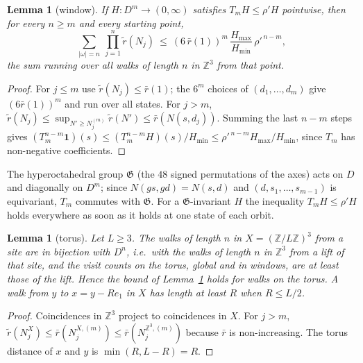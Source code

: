 \documentclass[11pt,a4paper]{article}
\theoremstyle{plain}
\newtheorem{lemma}[theorem]{Lemma}
\theoremstyle{remark}
\numberwithin{equation}{section}
\newcommand{\Z}{\mathbb{Z}}
\newcommand{\rt}{\widetilde r}
\newcommand{\rb}{\bar r}
\begin{document}
\begin{lemma}[window]\label{lem:window}
If $H:D^m\to(0,\infty)$ satisfies $T_mH\le\rho'H$ pointwise, then for every $n\ge m$ and every starting point,
\[
\sum_{|\omega|=n}\ \prod_{j=1}^{n}\rt(N_j)\ \le\ (6\,\rb(1))^m\,\frac{H_{\max}}{H_{\min}}\,\rho'^{\,n-m},
\]
the sum running over all walks of length $n$ in $\Z^3$ from that point.
\end{lemma}
\begin{proof}
For $j\le m$ use $\rt(N_j)\le\rb(1)$; the $6^m$ choices of $(d_1,\dots,d_m)$ give $(6\rb(1))^m$ and run over all states. For $j>m$,
$\rt(N_j)\le\sup_{N'\ge N_j^{(m)}}\rt(N')\le\rb(N(s,d_j))$. Summing the last $n-m$ steps gives $(T_m^{n-m}\mathbf 1)(s)\le
(T_m^{n-m}H)(s)/H_{\min}\le\rho'^{\,n-m}H_{\max}/H_{\min}$, since $T_m$ has non-negative coefficients.
\end{proof}

The hyperoctahedral group $\mathfrak G$ (the $48$ signed permutations of the axes) acts on $D$ and diagonally on $D^m$; since
$N(gs,gd)=N(s,d)$ and $(d,s_1,\dots,s_{m-1})$ is equivariant, $T_m$ commutes with $\mathfrak G$. For a $\mathfrak G$-invariant $H$
the inequality $T_mH\le\rho'H$ holds everywhere as soon as it holds at one state of each orbit.

\begin{lemma}[torus]\label{lem:torus}
Let $L\ge3$. The walks of length $n$ in $X=(\Z/L\Z)^3$ from a site are in bijection with $D^n$, i.e.\ with the walks of length $n$ in
$\Z^3$ from a lift of that site, and the visit counts on the torus, global and in windows, are at least those of the lift. Hence the
bound of Lemma~\ref{lem:window} holds for walks on the torus. A walk from $y$ to $x=y-Re_1$ in $X$ has length at least $R$ when
$R\le L/2$.
\end{lemma}
\begin{proof}
Coincidences in $\Z^3$ project to coincidences in $X$. For $j>m$, $\rt(N_j^{X})\le\rb(N_j^{X,(m)})\le\rb(N_j^{\Z^3,(m)})$ because $\rb$
is non-increasing. The torus distance of $x$ and $y$ is $\min(R,L-R)=R$.
\end{proof}
\end{document}

